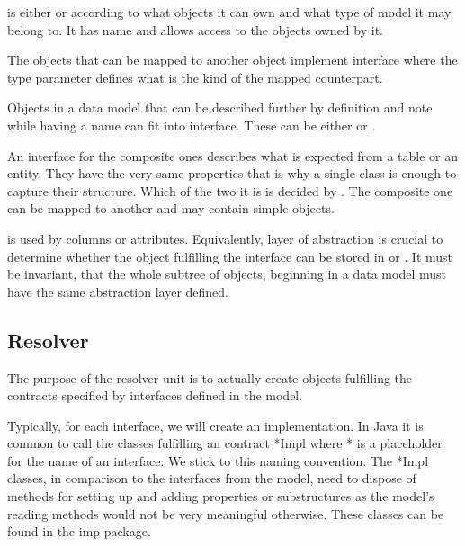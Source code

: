  is either  or  according to what objects it can own and what type of model it may belong to. 
It has name and allows access to the objects owned by it.

The objects that can be mapped to another object implement interface  where the type parameter defines what is the kind of the mapped counterpart.

Objects in a data model that can be described further by definition and note while having a name can fit into  interface. These can be either  or .

An interface for the composite ones describes what is expected from a table or an entity.
They have the very same properties that is why a single class is enough to capture their structure. Which of the two it is is decided by .
The composite one can be mapped to another  and may contain simple objects.

 is used by columns or attributes. Equivalently, layer of abstraction is crucial to determine whether the object fulfilling the interface can be stored in  or . It must be invariant, that the whole subtree of objects, beginning in a data model must have the same abstraction layer defined.
 

\subsection{Resolver}

The purpose of the resolver unit is to actually create objects fulfilling the contracts specified by interfaces defined in the model.

Typically, for each interface, we will create an implementation. In Java it is common to call the classes fulfilling an contract *Impl where * is a placeholder for the name of an interface. We stick to this naming convention. 
The *Impl classes, in comparison to the interfaces from the model, need to dispose of methods for setting up and adding properties or substructures as the model's reading methods would not be very meaningful otherwise. These classes can be found in the imp package. \\

